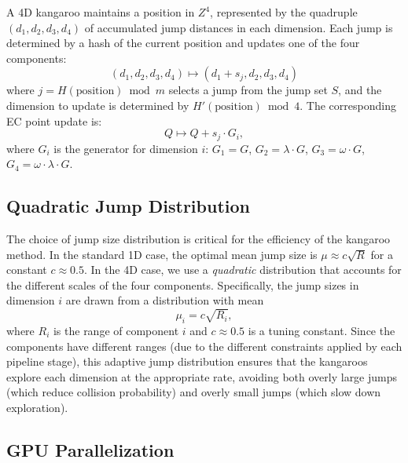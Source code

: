 \documentclass[11pt,a4paper]{article}
\theoremstyle{definition}
\begin{document}
A 4D kangaroo maintains a position in $Z^4$, represented by the quadruple $(d_1, d_2, d_3, d_4)$ of accumulated jump distances in each dimension. Each jump is determined by a hash of the current position and updates one of the four components:
\begin{equation}
  (d_1, d_2, d_3, d_4) \mapsto (d_1 + s_j, d_2, d_3, d_4)
\end{equation}
where $j = H(\mathrm{position}) \bmod m$ selects a jump from the jump set $S$, and the dimension to update is determined by $H'(\mathrm{position}) \bmod 4$. The corresponding EC point update is:
\begin{equation}
  Q \mapsto Q + s_j \cdot G_i,
\end{equation}
where $G_i$ is the generator for dimension $i$: $G_1 = G$, $G_2 = \lambda \cdot G$, $G_3 = \omega \cdot G$, $G_4 = \omega \cdot \lambda \cdot G$.

\subsection{Quadratic Jump Distribution}

The choice of jump size distribution is critical for the efficiency of the kangaroo method. In the standard 1D case, the optimal mean jump size is $\mu \approx c \sqrt{R}$ for a constant $c \approx 0.5$. In the 4D case, we use a \emph{quadratic} distribution that accounts for the different scales of the four components. Specifically, the jump sizes in dimension $i$ are drawn from a distribution with mean
\begin{equation}
  \mu_i = c \sqrt{R_i},
  \label{eq:quad-jump-mean}
\end{equation}
where $R_i$ is the range of component $i$ and $c \approx 0.5$ is a tuning constant. Since the components have different ranges (due to the different constraints applied by each pipeline stage), this adaptive jump distribution ensures that the kangaroos explore each dimension at the appropriate rate, avoiding both overly large jumps (which reduce collision probability) and overly small jumps (which slow down exploration).

\subsection{GPU Parallelization}
\end{document}
